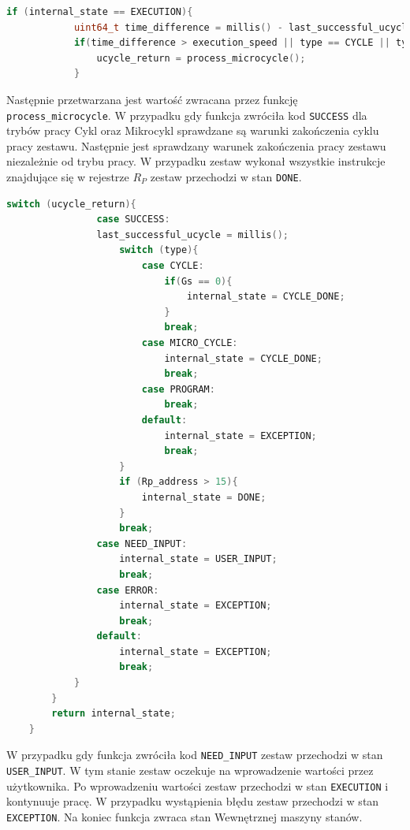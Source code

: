 \documentclass[../main.tex]{subfiles}
\begin{document}
\begin{lstlisting}[language=C++]
    if (internal_state == EXECUTION){
            uint64_t time_difference = millis() - last_successful_ucycle;
            if(time_difference > execution_speed || type == CYCLE || type == MICRO_CYCLE){
                ucycle_return = process_microcycle();
            }
\end{lstlisting}

\par
Następnie przetwarzana jest wartość zwracana przez funkcję \texttt{process\_microcycle}. W przypadku gdy funkcja zwróciła kod \texttt{SUCCESS}
dla trybów pracy Cykl oraz Mikrocykl sprawdzane są warunki zakończenia cyklu pracy zestawu. Następnie jest sprawdzany warunek zakończenia pracy
zestawu niezależnie od trybu pracy. W przypadku zestaw wykonał wszystkie instrukcje znajdujące się w rejestrze $R_P$ zestaw przechodzi w stan \texttt{DONE}.

\begin{lstlisting}[language=C++]
            switch (ucycle_return){
                case SUCCESS:
                last_successful_ucycle = millis();
                    switch (type){
                        case CYCLE:
                            if(Gs == 0){
                                internal_state = CYCLE_DONE;
                            }
                            break;
                        case MICRO_CYCLE:
                            internal_state = CYCLE_DONE;
                            break;
                        case PROGRAM:
                            break;
                        default:
                            internal_state = EXCEPTION;
                            break;
                    }
                    if (Rp_address > 15){
                        internal_state = DONE;
                    }
                    break;
                case NEED_INPUT:
                    internal_state = USER_INPUT;
                    break;
                case ERROR:
                    internal_state = EXCEPTION;
                    break;
                default:
                    internal_state = EXCEPTION;
                    break;
            }
        }
        return internal_state;
    }
\end{lstlisting}

\par
W przypadku gdy funkcja zwróciła kod \texttt{NEED\_INPUT} zestaw przechodzi w stan \texttt{USER\_INPUT}. W tym stanie zestaw oczekuje na wprowadzenie
wartości przez użytkownika. Po wprowadzeniu wartości zestaw przechodzi w stan \texttt{EXECUTION} i kontynuuje pracę. W przypadku wystąpienia
błędu zestaw przechodzi w stan \texttt{EXCEPTION}. Na koniec funkcja zwraca stan Wewnętrznej maszyny stanów.
\end{document}
